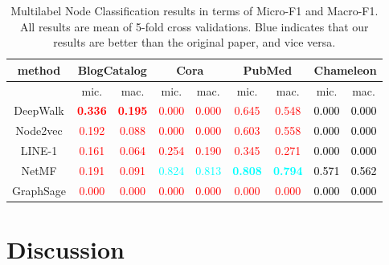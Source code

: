 \documentclass[a4paper]{article}
\begin{document}
\begin{table}[H]
\centering
\begin{tabular}{|c|c|c|c|c|c|c|c|c|}
\hline
method & \multicolumn{2}{|c|}{BlogCatalog}& \multicolumn{2}{|c|}{Cora}& \multicolumn{2}{|c|}{PubMed} & \multicolumn{2}{|c|}{Chameleon}\\
\hline
& mic. & mac. &mic. & mac.& mic. & mac.& mic. & mac.\\
\hline
DeepWalk& \textcolor{red}{\textbf{0.336}}& \textcolor{red}{\textbf{0.195}}&\textcolor{red}{0.000}&\textcolor{red}{0.000}&\textcolor{red}{0.645}&\textcolor{red}{0.548}&\textcolor{black}{0.000}&\textcolor{black}{0.000}\\
Node2vec& \textcolor{red}{0.192}& \textcolor{red}{0.088}&\textcolor{red}{0.000}&\textcolor{red}{0.000}&\textcolor{red}{0.603}&\textcolor{red}{0.558}&\textcolor{black}{0.000}&\textcolor{black}{0.000}\\
LINE-1& \textcolor{red}{0.161}& \textcolor{red}{0.064}&\textcolor{red}{0.254}&\textcolor{red}{0.190}&\textcolor{red}{0.345}&\textcolor{red}{0.271}&\textcolor{black}{0.000}&\textcolor{black}{0.000}\\
NetMF& \textcolor{red}{0.191}& \textcolor{red}{0.091}&\textcolor{cyan}{0.824}&\textcolor{cyan}{0.813}& \textcolor{cyan}{\textbf{0.808}}&\textcolor{cyan}{\textbf{0.794}}&\textcolor{black}{0.571}&\textcolor{black}{0.562}\\
GraphSage& \textcolor{red}{0.000}& \textcolor{red}{0.000}&\textcolor{red}{0.000}&\textcolor{red}{0.000}&\textcolor{red}{0.000}&\textcolor{red}{0.000}&\textcolor{black}{0.000}&\textcolor{black}{0.000}\\
\hline
\end{tabular}
\caption{Multilabel Node Classification results in terms of Micro-F1 and Macro-F1. All results are mean of 5-fold cross validations. Blue indicates that our results are better than the original paper, and vice versa.}
\end{table}


\section{Discussion}

\end{document}

